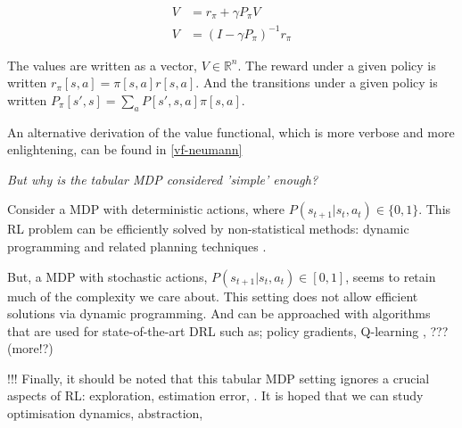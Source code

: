 \begin{align}
V &= r_{\pi} + \gamma P_{\pi} V \tag{tabular Bellman eqn}\\
V &= (I-\gamma P_{\pi})^{-1}r_{\pi}  \label{eq:value-functional}\tag{Value functional}
\end{align}

The values are written as a vector, $V \in \mathbb R^n$.
The reward under a given policy is written $r_{\pi}[s, a] = \pi[s, a] r[s, a]$.
And the transitions under a given policy is written $P_{\pi}[s', s] = \sum_a P[s', s, a]\pi[s, a]$.

An alternative derivation of the value functional, which is more verbose and more enlightening, can be found in \ref{vf-neumann}

\begin{displayquote}
\textit{But why is the tabular MDP considered 'simple' enough?}
\end{displayquote}

Consider a MDP with deterministic actions, where $P(s_{t+1}|s_t, a_t) \in \{ 0, 1\}$.
This RL problem can be efficiently solved by non-statistical
methods: dynamic programming and related planning techniques \cite{Bertsekas1995}.

But, a MDP with stochastic actions, $P(s_{t+1}|s_t, a_t) \in [0, 1]$,
seems to retain much of the complexity we care about. This setting does not allow
efficient solutions via dynamic programming. And can be approached with algorithms
that are used for state-of-the-art DRL such as;
policy gradients\cite{Schulman2015a}, Q-learning \cite{Mnih2015}, ??? (more!?)

{\color{red}!!!}
Finally, it should be noted that this tabular MDP setting ignores a crucial
aspects of RL: exploration, estimation error, . It is hoped that we can study
optimisation dynamics,  abstraction,

